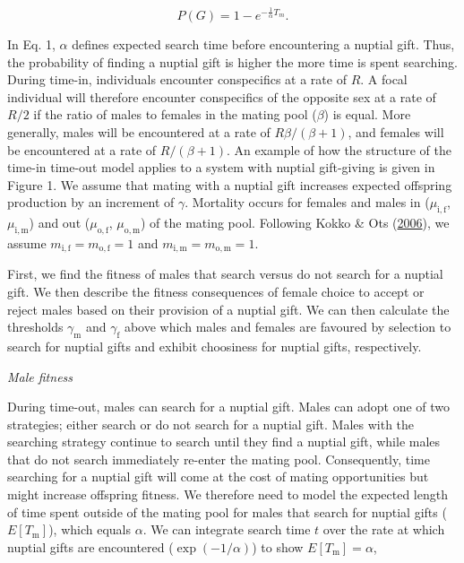 \documentclass[
]{article}
\begin{document}
\[P(G) = 1 - e^{-\frac{1}{\alpha}T_{m}}.
\tag{1}
\]

In Eq. 1, \(\alpha\) defines expected search time before encountering a
nuptial gift. Thus, the probability of finding a nuptial gift is higher
the more time is spent searching. During time-in, individuals encounter
conspecifics at a rate of \(R\). A focal individual will therefore
encounter conspecifics of the opposite sex at a rate of \(R/2\) if the
ratio of males to females in the mating pool (\(\beta\)) is equal. More
generally, males will be encountered at a rate of \(R\beta/(\beta+1)\),
and females will be encountered at a rate of \(R/(\beta+1)\). An example
of how the structure of the time-in time-out model applies to a system
with nuptial gift-giving is given in Figure 1. We assume that mating
with a nuptial gift increases expected offspring production by an
increment of \(\gamma\). Mortality occurs for females and males in
(\(\mu_{\mathrm{i,f}}\), \(\mu_{\mathrm{i,m}}\)) and out
(\(\mu_{\mathrm{o,f}}\), \(\mu_{\mathrm{o,m}}\)) of the mating pool.
Following Kokko \& Ots (\protect\hyperlink{ref-Kokko2006}{2006}), we
assume \(m_{\mathrm{i,f}} = m_{\mathrm{o,f}} = 1\) and
\(m_{\mathrm{i,m}} = m_{\mathrm{o,m}} = 1\).

First, we find the fitness of males that search versus do not search for
a nuptial gift. We then describe the fitness consequences of female
choice to accept or reject males based on their provision of a nuptial
gift. We can then calculate the thresholds \(\gamma_{\mathrm{m}}\) and
\(\gamma_{\mathrm{f}}\) above which males and females are favoured by
selection to search for nuptial gifts and exhibit choosiness for nuptial
gifts, respectively.

\emph{Male fitness}

During time-out, males can search for a nuptial gift. Males can adopt
one of two strategies; either search or do not search for a nuptial
gift. Males with the searching strategy continue to search until they
find a nuptial gift, while males that do not search immediately re-enter
the mating pool. Consequently, time searching for a nuptial gift will
come at the cost of mating opportunities but might increase offspring
fitness. We therefore need to model the expected length of time spent
outside of the mating pool for males that search for nuptial gifts
(\(E[T_{\mathrm{m}}]\)), which equals \(\alpha\). We can integrate
search time \(t\) over the rate at which nuptial gifts are encountered
(\(\exp(-1/\alpha)\)) to show \(E[T_{\mathrm{m}}] = \alpha\),
\end{document}
